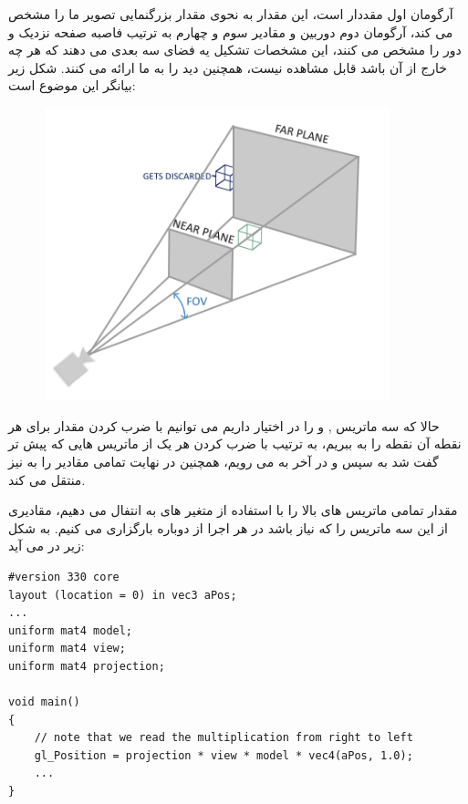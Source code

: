 \documentclass[a4paper, 12pt]{book}
\newcommand{\lrit}[1]{\lr{\textit{#1}}}
\begin{document}
    آرگومان اول مقددار  است، این مقدار به نحوی مقدار بزرگنمایی تصویر ما را مشخص می کند، آرگومان دوم  دوربین و مقادیر سوم و چهارم به ترتیب فاصبه صفحه نزدیک و دور را مشخص می کنند، این مشخصات تشکیل یه فضای سه بعدی می دهند که هر چه خارج از آن باشد قابل مشاهده نیست، همچنین دید  را به ما ارائه می کنند.
    شکل زیر بیانگر این موضوع است:

\begin{figure}[ht]
    \centering
    \href{https://learnopengl.com}{
        \includegraphics[width=10cm]{images/perspective_frustum.png}
    }
    \caption{}
    \label{fig:my_label}
\end{figure}

    حالا که سه ماتریس ,  و  را در اختیار داریم می توانیم با ضرب کردن مقدار  برای هر نقطه آن نقطه را به  ببریم، به ترتیب با ضرب کردن هر یک از ماتریس هایی که پیش تر گفت شد به  سپس  و در آخر به  می رویم، همچنین  در نهایت تمامی مقادیر را به  نیز منتقل می کند.\par
    مقدار تمامی ماتریس های بالا را با استفاده از متغیر های  به  انتفال می دهیم، مقادیری از این سه ماتریس را که نیاز باشد در هر اجرا از  دوباره بارگزاری می کنیم. به شکل زیر در می آید:
    \newpage
    \begin{LTR}
    \small
        \begin{lstlisting}[style=C++Style,caption=\lrit{going 3D}]
#version 330 core
layout (location = 0) in vec3 aPos;
...
uniform mat4 model;
uniform mat4 view;
uniform mat4 projection;

void main()
{
    // note that we read the multiplication from right to left
    gl_Position = projection * view * model * vec4(aPos, 1.0);
    ...
}
        \end{lstlisting}
    \end{LTR}
    \normalsize
    \vspace*{0.3cm}
\end{document}
